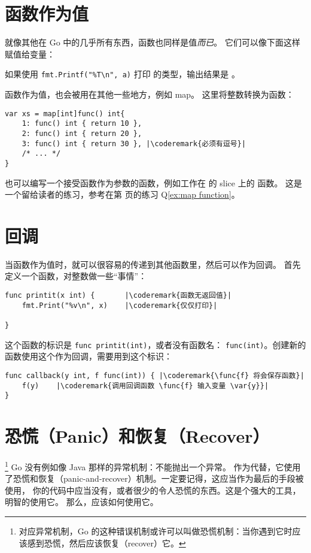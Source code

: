 \section{函数作为值}
\label{sec:functions as values}
就像其他在 Go 中的几乎所有东西，函数也同样是值\emph{而已}。
它们可以像下面这样赋值给变量：

如果使用 \lstinline{fmt.Printf("%T\n", a)} 打印  的类型，输出结果是 。

函数作为值，也会被用在其他一些地方，例如 map。
这里将整数转换为函数：
\begin{lstlisting}[caption=使用 map 的函数作为值]
var xs = map[int]func() int{
    1: func() int { return 10 },
    2: func() int { return 20 },
    3: func() int { return 30 }, |\coderemark{必须有逗号}|
    /* ... */
}
\end{lstlisting}
也可以编写一个接受函数作为参数的函数，例如工作在  的 slice 上的  函数。
这是一个留给读者的练习，参考在第 \pageref{ex:map function} 页的练习 Q\ref{ex:map function}。

\section{回调}
\label{sec:callbacks}
当函数作为值时，就可以很容易的传递到其他函数里，然后可以作为回调。
首先定义一个函数，对整数做一些“事情”：
\begin{lstlisting}
func printit(x int) {       |\coderemark{函数无返回值}|
    fmt.Print("%v\n", x)    |\coderemark{仅仅打印}|

}
\end{lstlisting}
这个函数的标识是 \lstinline{func printit(int)}，或者没有函数名：
\mbox{\lstinline{func(int)}}。创建新的函数使用这个作为回调，需要用到这个标识：
\begin{lstlisting}
func callback(y int, f func(int)) { |\coderemark{\func{f} 将会保存函数}|
    f(y)    |\coderemark{调用回调函数 \func{f} 输入变量 \var{y}}|
}
\end{lstlisting}

\section{恐慌（Panic）和恢复（Recover）}
\label{sec:panic}
\footnote{对应异常机制，Go 的这种错误机制或许可以叫做恐慌机制：当你遇到它时应该感到恐慌，然后应该恢复（recover）它。}
Go 没有例如像 Java 那样的异常机制：不能抛出一个异常。
作为代替，它使用了恐慌和恢复（panic-and-recover）机制。一定要记得，这应当作为最后的手段被使用，
你的代码中应当没有，或者很少的令人恐慌的东西。这是个强大的工具，明智的使用它。
那么，应该如何使用它。

